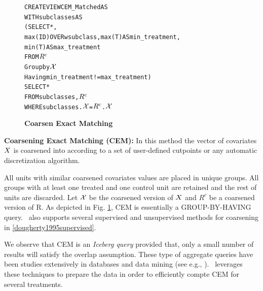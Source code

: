 




\begin{figure}
\begin{alltt} \scriptsize
CREATE VIEW CEM_Matched AS
WITH subclasses AS
  (SELECT *,
          max(ID) OVER w subclass, max(T) AS min_treatment,
          min(T)AS max_treatment
   FROM \(\crele\)
   Group by \(\ccv\)
   Having min_treatment!=max_treatment)
SELECT *
FROM subclasses,\(\crele\)
WHERE subclasses.\(\ccv\)=\(\crele\).\(\ccv\)

\end{alltt}
\vspace{-.45cm}
  \caption{\bf Coarsen Exact Matching}\label{fig:cem}
\end{figure}



{\bf Coarsening Exact Matching (CEM):} In this method the vector of covariates ${{X}}$ is
coarsened into according to a set of user-defined cutpoints or any
automatic discretization algorithm.
All units with similar coarsened
covariates values are placed in unique groups. All
groups with at least one treated and one control unit are retained
and the rest of units are discarded.  Let ${{\mathcal{X}}}$ be the
coarsened version of ${{X}}$ and $R^c$ be a coarsened
version of R. As depicted in Fig. \ref{fig:cem},
CEM is essentially a GROUP-BY-HAVING query.
 \GSQL\  also supports several supervised and unsupervised methods for coarsening in \ref{dougherty1995supervised}.

We observe that CEM is an {\em Iceberg query} provided that,
only a small number of results will satisfy the overlap assumption. These type of aggregate
queries have been studies extensively in databases and data mining (see e.g.,
\cite{fang1999computing,findlater2003iceberg,he2012efficient}).
\GSQL\ leverages these techniques to prepare
the data in order to efficiently compte CEM for several treatments.


